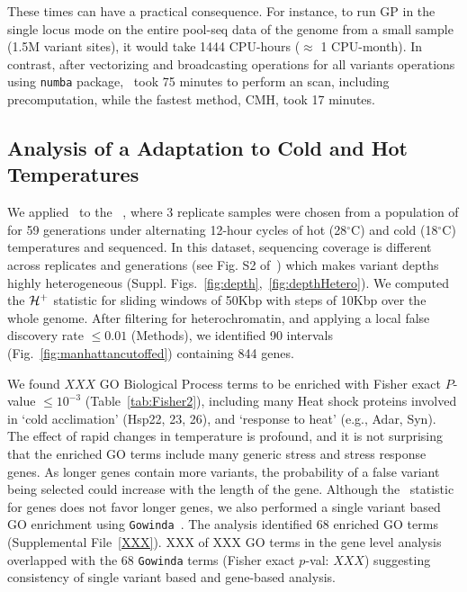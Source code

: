 These times can have a practical consequence. For instance, to run GP
in the single locus mode on the entire pool-seq data of the \dmel genome from a
small sample (1.5M variant sites), it would take 1444 CPU-hours
($\approx$ 1 CPU-month). In contrast, after vectorizing and
broadcasting operations for all variants operations using
\texttt{numba} package, \comale\ took 75 minutes to perform an
scan, including precomputation, while the fastest method, CMH, took 17 minutes.

\subsection{Analysis of a \dmel Adaptation to Cold and Hot 
Temperatures}\label{sec:dmel}
We applied \comale\ to the \datadm~\cite{orozco2012adaptation}, where 3
replicate samples were chosen from a population of \dmel for 59
generations under alternating 12-hour cycles of hot (28$^{\circ}$C)
and cold (18$^{\circ}$C) temperatures and sequenced.  In this dataset,
sequencing coverage is different across replicates and generations
(see Fig. S2 of~\cite{Terhorst2015Multi}) which makes variant depths
highly heterogeneous (Suppl.
Figs.~\ref{fig:depth},~\ref{fig:depthHetero}). We computed the
${\cal H}^{+}$ statistic for sliding windows of 50Kbp with steps of 10Kbp
over the whole genome. After filtering for heterochromatin, and
applying a local false discovery rate $\le 0.01$ (Methods), we
identified 90 intervals (Fig.~\ref{fig:manhattancutoffed}) containing
844 genes.

We found $XXX$ GO Biological Process terms to be enriched with Fisher
exact $P$-value $\le 10^{-3}$ (Table~\ref{tab:Fisher2}), including
many Heat shock proteins involved in `cold acclimation' (Hsp22, 23,
26), and `response to heat' (e.g., Adar, Syn). The effect of rapid
changes in temperature is profound, and it is not surprising that the
enriched GO terms include many generic stress and stress response
genes. As longer genes contain more variants, the probability of a
false variant being selected could increase with the length of the
gene. Although the \comale\ statistic for genes does not favor longer
genes, we also performed a single variant based GO enrichment using
\texttt{Gowinda}~\cite{kofler2012gowinda}. The analysis identified 68
enriched GO terms (Supplemental File~\ref{XXX}). XXX of XXX GO terms
in the gene level analysis overlapped with the $68$ \texttt{Gowinda}
terms (Fisher exact $p$-val: $XXX$) suggesting consistency of single
variant based and gene-based analysis.
